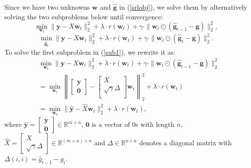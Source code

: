 \documentclass[journal]{IEEEtran}
\begin{document}
   Since we have two unknowns $\textbf{w}$ and $\hat{\textbf{g}}$ in (\ref{srlobj}), we solve them by alternatively solving the two subproblems below until convergence:
%   
   \begin{equation}
     \min_{\textbf{w}_t} \|\textbf{y}-X\textbf{w}_t\|^2_2+  \lambda\cdot r(\textbf{w}_t) +\gamma  \cdot  \|\textbf{w}_t\odot (\hat{\textbf{g}}_{t-1} -\textbf{g})  \|_2^2,  \label{sub1}
   \end{equation} 
     \begin{equation}
       \min_{\hat{\textbf{g}}_t} \|\textbf{y}-X\textbf{w}_t\|^2_2+  \lambda \cdot r(\textbf{w}_t) +\gamma\cdot  \|\textbf{w}_t\odot (\hat{\textbf{g}}_t -\textbf{g})  \|_2^2.\label{sub2}
 \end{equation} 
   To solve the first subproblem in (\ref{sub1}),  we rewrite  it as:
   \begin{align} &\min_{\textbf{w}_t} \|\textbf{y}-X\textbf{w}_t\|^2_2+  \lambda \cdot r(\textbf{w}_t) +\gamma  \cdot  \|\textbf{w}_t\odot (\hat{\textbf{g}}_{t-1} -\textbf{g})  \|_2^2\nonumber \\
   & = \min_{\textbf{w}_t} \left\|\left[\begin{array}{c}\textbf{y}  \nonumber \\ \textbf{0}
   \end{array}\right]-
   \left[\begin{array}{c}X  \nonumber \\
   \sqrt{\gamma}\Delta   \\
   \end{array}\right]\textbf{w}_t \right\|^2_2 + \lambda\cdot r(\textbf{w}_t)\nonumber \\
   &  =  \min_{\textbf{w}_t}   \|\hat{\textbf{y}}-\hat{X}\textbf{w}_t\|^2_2+\lambda\cdot r(\textbf{w}_t),        \label{eq09}
   \end{align}
   where  $\hat{\textbf{y}}=\left[\begin{array}{c}\textbf{y} \\
   \textbf{0}    
   \end{array}\right] \in \mathbb{R}^{m+n}$, $\textbf{0}$ is a vector of 0s with length $n$,  $\hat{X}=\left[\begin{array}{c}X \\
   \sqrt{\gamma}\Delta   \end{array}\right]  \in \mathbb{R}^{(m+n)\times n}$ and  $\Delta \in \mathbb{R}^{n\times n}$ denotes a diagonal matrix with $\Delta(i,i)=\hat{g}_{t-1}-g_i$.
\end{document}
